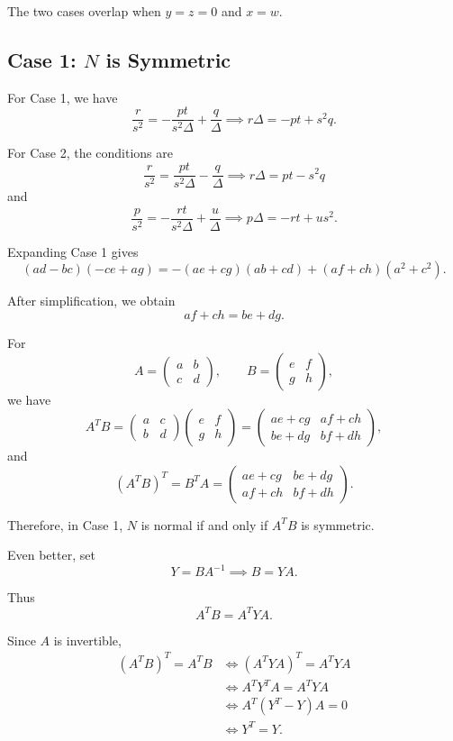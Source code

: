 \documentclass[11pt, reqno, a4paper]{amsart}
\theoremstyle{plain}
\theoremstyle{definition}
\theoremstyle{remark}
\numberwithin{equation}{section}
\begin{document}
The two cases overlap when $y=z=0$ and $x=w$.

\subsection{Case 1: $N$ is Symmetric}

For Case 1, we have
\[
\frac{r}{s^2}
=
-\frac{pt}{s^2\Delta}+\frac{q}{\Delta}
\implies
r\Delta=-pt+s^2q.
\]

For Case 2, the conditions are
\[
\frac{r}{s^2}
=
\frac{pt}{s^2\Delta}-\frac{q}{\Delta}
\implies
r\Delta=pt-s^2q
\]
and
\[
\frac{p}{s^2}
=
-\frac{rt}{s^2\Delta}+\frac{u}{\Delta}
\implies
p\Delta=-rt+us^2.
\]

Expanding Case 1 gives
\[
(ad-bc)(-ce+ag)
=
-(ae+cg)(ab+cd)
+(af+ch)(a^2+c^2).
\]

After simplification, we obtain
\[
af+ch=be+dg.
\]

For
\[
A=
\begin{pmatrix}
a&b\\
c&d
\end{pmatrix},
\qquad
B=
\begin{pmatrix}
e&f\\
g&h
\end{pmatrix},
\]
we have
\[
A^TB
=
\begin{pmatrix}
a&c\\
b&d
\end{pmatrix}
\begin{pmatrix}
e&f\\
g&h
\end{pmatrix}
=
\begin{pmatrix}
ae+cg&af+ch\\
be+dg&bf+dh
\end{pmatrix},
\]
and
\[
(A^TB)^T=B^TA
=
\begin{pmatrix}
ae+cg&be+dg\\
af+ch&bf+dh
\end{pmatrix}.
\]

Therefore, in Case 1, $N$ is normal if and only if $A^TB$ is symmetric.

Even better, set
\[
Y=BA^{-1}\implies B=YA.
\]

Thus
\[
A^TB=A^TYA.
\]

Since $A$ is invertible,
\begin{align*}
(A^TB)^T=A^TB
&\iff (A^TYA)^T=A^TYA\\
&\iff A^TY^TA=A^TYA\\
&\iff A^T(Y^T-Y)A=0\\
&\iff Y^T=Y.
\end{align*}
\end{document}
